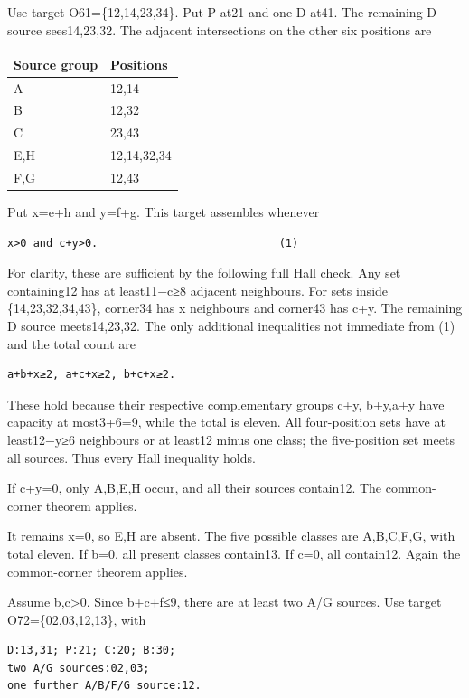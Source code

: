 \documentclass[
  10pt,
]{article}
\begin{document}
Use target O61=\{12,14,23,34\}. Put P at21 and one D at41. The remaining
D source sees14,23,32. The adjacent intersections on the other six
positions are

\begin{longtable}[]{@{}ll@{}}
\toprule\noalign{}
Source group & Positions \\
\midrule\noalign{}
\endhead
\bottomrule\noalign{}
\endlastfoot
A & 12,14 \\
B & 12,32 \\
C & 23,43 \\
E,H & 12,14,32,34 \\
F,G & 12,43 \\
\end{longtable}

Put x=e+h and y=f+g. This target assembles whenever

\begin{verbatim}
x>0 and c+y>0.                            (1)
\end{verbatim}

For clarity, these are sufficient by the following full Hall check. Any
set containing12 has at least11−c≥8 adjacent neighbours. For sets inside
\{14,23,32,34,43\}, corner34 has x neighbours and corner43 has c+y. The
remaining D source meets14,23,32. The only additional inequalities not
immediate from (1) and the total count are

\begin{verbatim}
a+b+x≥2, a+c+x≥2, b+c+x≥2.
\end{verbatim}

These hold because their respective complementary groups c+y, b+y,a+y
have capacity at most3+6=9, while the total is eleven. All four-position
sets have at least12−y≥6 neighbours or at least12 minus one class; the
five-position set meets all sources. Thus every Hall inequality holds.

If c+y=0, only A,B,E,H occur, and all their sources contain12. The
common-corner theorem applies.

It remains x=0, so E,H are absent. The five possible classes are
A,B,C,F,G, with total eleven. If b=0, all present classes contain13. If
c=0, all contain12. Again the common-corner theorem applies.

Assume b,c\textgreater0. Since b+c+f≤9, there are at least two A/G
sources. Use target O72=\{02,03,12,13\}, with

\begin{verbatim}
D:13,31; P:21; C:20; B:30;
two A/G sources:02,03;
one further A/B/F/G source:12.
\end{verbatim}
\end{document}
